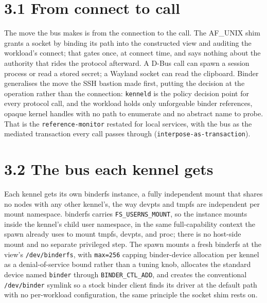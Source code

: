 \hypertarget{from-connect-to-call}{%
\section{3.1 From connect to call}\label{from-connect-to-call}}

The move the bus makes is from the connection to the call. The AF\_UNIX
shim grants a socket by binding its path into the constructed view and
auditing the workload's connect; that gates once, at connect time, and
says nothing about the authority that rides the protocol afterward. A
D-Bus call can spawn a session process or read a stored secret; a
Wayland socket can read the clipboard. Binder generalises the move the
SSH bastion made first, putting the decision at the operation rather
than the connection: \texttt{kenneld} is the policy decision point for
every protocol call, and the workload holds only unforgeable binder
references, opaque kernel handles with no path to enumerate and no
abstract name to probe. That is the \texttt{reference-monitor} restated
for local services, with the bus as the mediated transaction every call
passes through (\texttt{interpose-as-transaction}).

\hypertarget{the-bus-each-kennel-gets}{%
\section{3.2 The bus each kennel gets}\label{the-bus-each-kennel-gets}}

Each kennel gets its own binderfs instance, a fully independent mount
that shares no nodes with any other kennel's, the way devpts and tmpfs
are independent per mount namespace. binderfs carries
\texttt{FS\_USERNS\_MOUNT}, so the instance mounts inside the kennel's
child user namespace, in the same full-capability context the spawn
already uses to mount tmpfs, devpts, and proc; there is no host-side
mount and no separate privileged step. The spawn mounts a fresh binderfs
at the view's \texttt{/dev/binderfs}, with \texttt{max=256} capping
binder-device allocation per kennel as a denial-of-service bound rather
than a tuning knob, allocates the standard device named \texttt{binder}
through \texttt{BINDER\_CTL\_ADD}, and creates the conventional
\texttt{/dev/binder} symlink so a stock binder client finds its driver
at the default path with no per-workload configuration, the same
principle the socket shim rests on.

